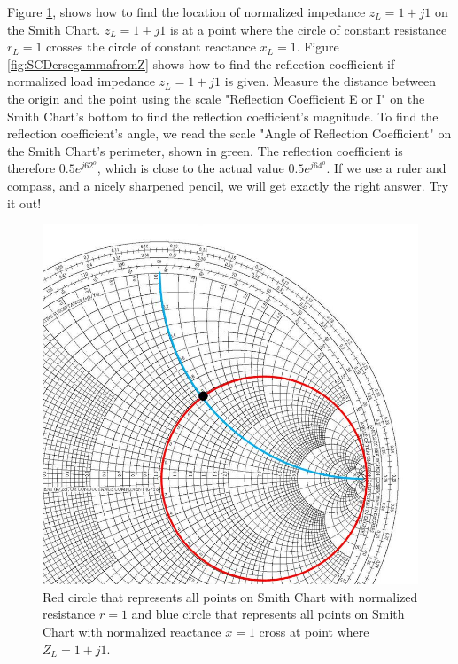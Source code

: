 \documentclass{ximera}
\begin{document}
Figure \ref{fig:SCDerscimpedance}, shows how to find the location of normalized impedance  $z_L=1+j 1$ on the Smith Chart.  $z_L=1+j 1$ is at a point where the circle of constant resistance $r_L=1$ crosses the circle of constant reactance $x_L=1$.   Figure \ref{fig:SCDerscgammafromZ} shows how to find the reflection coefficient if normalized load impedance $z_L=1+j 1$ is given. Measure the distance between the origin and the point using the scale "Reflection Coefficient E or I" on the Smith Chart's bottom to find the reflection coefficient's magnitude. To find the reflection coefficient's angle, we read the scale "Angle of Reflection Coefficient" on the Smith Chart's perimeter, shown in green. The reflection coefficient is therefore $0.5 e^{j 62^o}$, which is close to the actual value   $0.5 e^{j 64^o}$. If we use a ruler and compass, and a nicely sharpened pencil, we will get exactly the right answer. Try it out!


\begin{figure}[htbp]
\begin{center}
\includegraphics[scale=0.3]{../jpg/FindingImpedanceonSC.jpg}
\end{center}
\caption{Red circle that represents all points on Smith Chart with normalized resistance $r=1$ and blue circle that represents all points on Smith Chart with  normalized reactance $x=1$ cross at point where $Z_L=1+j 1$.}
\label{fig:SCDerscimpedance}
\end{figure}
\end{document}
